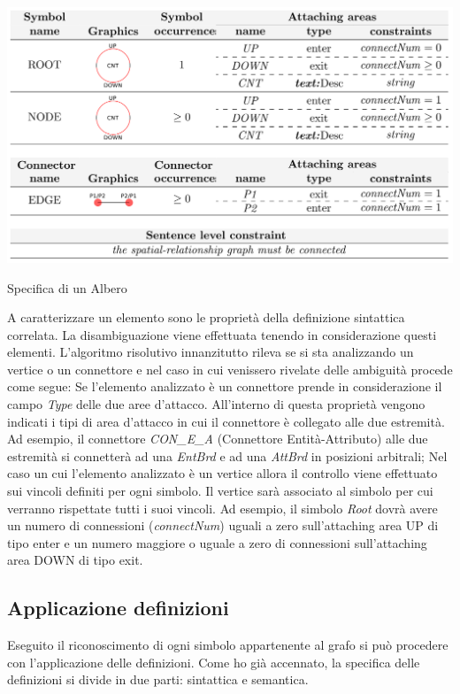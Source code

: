             \begin{table}[htbp]
                \centering
                \includegraphics[scale=0.4]{Figure/final_syntax_definition_tree.PNG}
                \caption{Specifica di un Albero}
                \label{tab:final_syntax_definition_tree}
            \end{table}

            A caratterizzare un elemento sono le proprietà della definizione sintattica correlata. La disambiguazione viene effettuata tenendo in considerazione questi elementi.
            \newline
            L'algoritmo risolutivo innanzitutto rileva se si sta analizzando un vertice o un connettore e nel caso in cui venissero rivelate delle ambiguità procede come segue: Se l'elemento analizzato è un connettore prende in considerazione il campo \textit{Type} delle due aree d'attacco. All'interno di questa proprietà vengono indicati i tipi di area d'attacco in cui il connettore è collegato alle due estremità. Ad esempio, il connettore \textit{CON\_E\_A} (Connettore Entità-Attributo) alle due estremità si connetterà ad una \textit{EntBrd} e ad una \textit{AttBrd} in posizioni arbitrali; Nel caso un cui l'elemento analizzato è un vertice allora il controllo viene effettuato sui vincoli definiti per ogni simbolo. Il vertice sarà associato al simbolo per cui verranno rispettate tutti i suoi vincoli. Ad esempio, il simbolo \textit{Root} dovrà avere un numero di connessioni (\textit{connectNum}) uguali a zero sull'attaching area UP di tipo enter e un numero maggiore o uguale a zero di connessioni sull'attaching area DOWN di tipo exit.
            \newline

        \subsection{Applicazione definizioni}
            Eseguito il riconoscimento di ogni simbolo appartenente al grafo si può procedere con l'applicazione delle definizioni. Come ho già accennato, la specifica delle definizioni si divide in due parti: sintattica e semantica.

